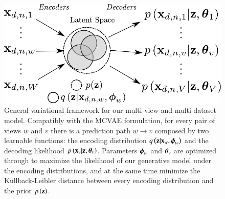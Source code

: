 \begin{figure}[htbp]
\centering
\includegraphics[width=\columnwidth]{./tex/fig/architecture.pdf}
\caption{
General variational framework for our multi-view and multi-dataset model.
Compatibly with the MCVAE formulation, for every pair of views $w$ and $v$
there is a prediction path $w \rightarrow v$ composed by two learnable functions:
the encoding distribution $q\left(\mathbf{z}|\mathbf{x}_w, \boldsymbol{\phi}_w\right)$ and the decoding likelihood $p\left(\mathbf{x}_v|\mathbf{z}, \boldsymbol{\theta}_v\right)$.
Parameters $\boldsymbol{\phi}_w$ and $\boldsymbol{\theta}_v$ are optimized through  to maximize the likelihood of our generative model under the encoding distributions, and at the same time minimize the Kullback-Leibler distance between every encoding distribution and the prior $p\left(\mathbf{z}\right)$.
}
\label{fig:architecture}
\end{figure}

